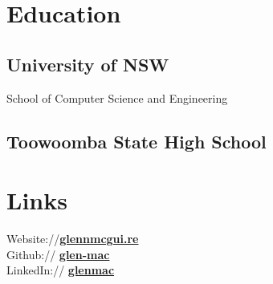 \documentclass[letterpaper]{deedy-resume} %
\begin{document}
\begin{minipage}[t]{0.33\textwidth} %


\section{Education} 
\sectionspace %
\subsection{University of NSW}
\sectionspace %
School of Computer Science and Engineering \\

\sectionspace %
\sectionspace %

%
%


\subsection{Toowoomba State High School}
\sectionspace %

\sectionspace %
\sectionspace %


\section{Links} 
\sectionspace %
Website://\href{http://glennmcgui.re}{\bf glennmcgui.re} \\
Github:// \href{https://github.com/glen-mac}{\bf glen-mac} \\
LinkedIn:// \href{https://au.linkedin.com/in/glenmac}{\bf glenmac} \\


\end{minipage}
\end{document}
